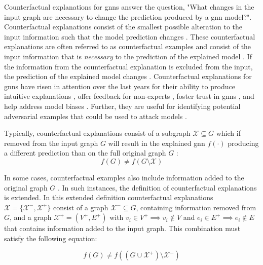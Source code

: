 Counterfactual explanations for \glspl{gnn} answer the question, "What changes in the input graph are necessary to change the prediction produced by a \gls{gnn} model?". Counterfactual explanations consist of the smallest possible alteration to the input information such that the model prediction changes \cite{kakkad_survey_2023}. These counterfactual explanations are often referred to as counterfactual examples and consist of the input information that is \textit{necessary} to the prediction of the explained model \cite{tan_learning_2022}. If the information from the counterfactual explanation is excluded from the input, the prediction of the explained model changes \cite{tan_learning_2022}. Counterfactual explanations for \glspl{gnn} have risen in attention over the last years \cite{ma_clear_2022} for their ability to produce intuitive explanations \cite{ma_clear_2022}, offer feedback for non-experts \cite{prado-romero_survey_2023}, foster trust in \glspl{gnn} \cite{prado-romero_survey_2023}, and help address model biases \cite{prado-romero_survey_2023}. Further, they are useful for identifying potential adversarial examples that could be used to attack models \cite{lucic_cf-gnnexplainer_2022}.

Typically, counterfactual explanations consist of a subgraph $\mathcal{X} \subseteq G$ which if removed from the input graph $G$ will result in the explained \gls{gnn} $f(\cdot)$ producing a different prediction than on the full original graph $G$ \cite{tan_learning_2022}:
\begin{equation}
    \label{e_cf_explanation}
    f(G) \neq f(G\setminus \mathcal{X})
\end{equation}

In some cases, counterfactual examples also include information added to the original graph $G$ \cite{abrate_counterfactual_2021}. In such instances, the definition of counterfactual explanations is extended. In this extended definition counterfactual explanations $\mathcal{X} = \{\mathcal{X}^-, \mathcal{X}^+\}$ consist of a graph $\mathcal{X}^- \subseteq G$, containing information removed from $G$, and a graph $\mathcal{X}^+ = (V^+, E^+)$ with ${v_i \in V^+ \implies v_i \notin V}$ and $e_i \in E^+ \implies e_i \notin E$ that contains information added to the input graph. This combination must satisfy the following equation:

\begin{equation}
    f(G) \neq f((G \cup \mathcal{X}^+) \setminus \mathcal{X^-})
\end{equation}

